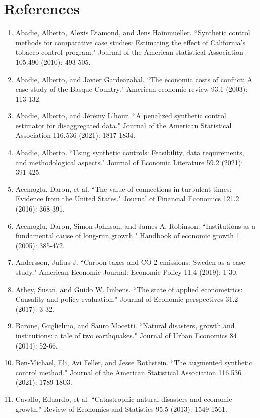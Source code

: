 \documentclass[12pt,a4paper,draft]{article}
\begin{document}
\section{References}
\begin{enumerate}
    \item Abadie, Alberto, Alexis Diamond, and Jens Hainmueller. ``Synthetic control methods for comparative case studies: Estimating the effect of California's tobacco control program." Journal of the American statistical Association 105.490 (2010): 493-505.
    \item Abadie, Alberto, and Javier Gardeazabal. ``The economic costs of conflict: A case study of the Basque Country." American economic review 93.1 (2003): 113-132.
    \item Abadie, Alberto, and Jérémy L'hour. ``A penalized synthetic control estimator for disaggregated data." Journal of the American Statistical Association 116.536 (2021): 1817-1834.
    \item Abadie, Alberto. ``Using synthetic controls: Feasibility, data requirements, and methodological aspects." Journal of Economic Literature 59.2 (2021): 391-425.
    \item Acemoglu, Daron, et al. ``The value of connections in turbulent times: Evidence from the United States." Journal of Financial Economics 121.2 (2016): 368-391.
    \item Acemoglu, Daron, Simon Johnson, and James A. Robinson. ``Institutions as a fundamental cause of long-run growth." Handbook of economic growth 1 (2005): 385-472.
    \item Andersson, Julius J. ``Carbon taxes and CO 2 emissions: Sweden as a case study." American Economic Journal: Economic Policy 11.4 (2019): 1-30.
    \item Athey, Susan, and Guido W. Imbens. ``The state of applied econometrics: Causality and policy evaluation." Journal of Economic perspectives 31.2 (2017): 3-32.
    \item Barone, Guglielmo, and Sauro Mocetti. ``Natural disasters, growth and institutions: a tale of two earthquakes." Journal of Urban Economics 84 (2014): 52-66.
    \item Ben-Michael, Eli, Avi Feller, and Jesse Rothstein. ``The augmented synthetic control method." Journal of the American Statistical Association 116.536 (2021): 1789-1803.
    \item Cavallo, Eduardo, et al. ``Catastrophic natural disasters and economic growth." Review of Economics and Statistics 95.5 (2013): 1549-1561.

\end{enumerate}
\end{document}

